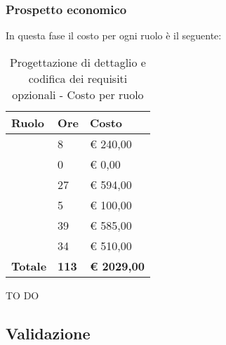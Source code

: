 		\subsubsection{Prospetto economico} %
		\label{ssub:prospetto_economico}
		In questa fase il costo per ogni ruolo è il seguente: \\
				\begin{table}[!h]
					\begin{center}
						\begin{tabularx}{0.65\textwidth}{|l|l|X|}
							\hline
							\textbf{Ruolo} & \textbf{Ore} & \textbf{Costo} \\
							\hline
							\roleProjectManager & 8 & \euro{} 240,00 \\
							\hline
							\roleAnalyst & 0 & \euro{} 0,00 \\
							\hline
							\roleDesigner & 27 & \euro{} 594,00 \\
							\hline
							\roleAdministrator & 5 & \euro{} 100,00 \\
							\hline
							\roleProgrammer & 39 & \euro{} 585,00 \\
							\hline
							\roleVerifier & 34 & \euro{} 510,00 \\
							\hline
							\textbf{Totale} & \textbf{113} & \textbf{\euro{} 2029,00} \\
							\hline
						\end{tabularx}
					\end{center}
				\caption{Progettazione di dettaglio e codifica dei requisiti opzionali - Costo per ruolo}
				\end{table}

			\noindent
			TO DO
		
	
	\subsection{Validazione} %
	\label{sub:validazione}
